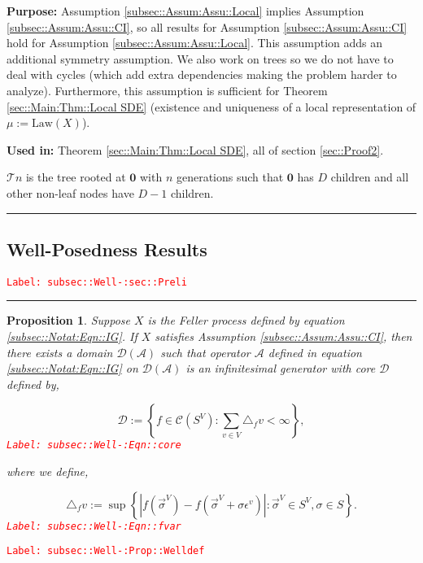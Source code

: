 \documentclass[12pt]{article}
\newcommand{\mc}{\mathcal}
\newcommand{\te}{\text}
\newcommand{\ep}{\epsilon}
\newcommand{\tr}{\textcolor{red}}
\newcommand{\labe}[1]{\tr{\texttt{Label: #1}}}
\newcommand{\purpose}{\textbf{Purpose: }}
\newcommand{\usein}{\textbf{Used in: }}
\newcommand{\ind}{\hspace{24pt}}
\newcommand{\lin}{\rule{\linewidth}{0.4 pt}}
\newcommand{\defeq}{:=}								%
\renewcommand{\root}{\mathbf{0}}				%
\renewcommand{\v}{v}							%
\renewcommand{\S}{S}							%
\newcommand{\s}{\sigma}							%
\newcommand{\sv}{\vec{\s}}						%
\newcommand{\ev}{\ep}							%
\newcommand{\X}{X}								%
\newcommand{\IG}{\mc{A}}						%
\newcommand{\f}{f}								%
\newcommand{\vind}[1]{^{#1}}					%
\newcommand{\carp}[1]{^{#1}}					%
\newcommand{\vsi}[1]{^{#1}}						%
\newcommand{\cind}[1]{_{#1}}					%
\newcommand{\degr}{D}							%
\newcommand{\tree}{\mc{T}}						%
\newcommand{\core}{\mc{D}}						%
\newcommand{\cont}{\mc{C}}						%
\newcommand{\delt}{\triangle}					%
\newcommand{\deltf}[1]{_{#1}}					%
\newcommand{\m}{\mu}							%
\newcommand{\law}{\te{Law}}						%
\newtheorem{prop}[thms]{Proposition}
\begin{document}
\purpose Assumption \ref{subsec::Assum:Assu::Local} implies Assumption \ref{subsec::Assum:Assu::CI}, so all results for Assumption \ref{subsec::Assum:Assu::CI} hold for Assumption \ref{subsec::Assum:Assu::Local}. This assumption adds an additional symmetry assumption. We also work on trees so we do not have to deal with cycles (which add extra dependencies making the problem harder to analyze). Furthermore, this assumption is sufficient for Theorem \ref{sec::Main:Thm::Local SDE} (existence and uniqueness of a local representation of \(\m{}{}{} \defeq \law(\X{}{})\)).

\usein Theorem \ref{sec::Main:Thm::Local SDE}, all of section \ref{sec::Proof2}.

\ind \(\tree{n}\) is the tree rooted at \(\root\) with \(n\) generations such that \(\root\) has \(\degr\) children and all other non-leaf nodes have \(\degr-1\) children.

\lin

\subsection{Well-Posedness Results}
\label{subsec::Well-:sec::Preli}\labe{subsec::Well-:sec::Preli}

\rule{\linewidth}{0.4 pt}

\begin{prop}
Suppose \(\X{}{}\) is the Feller process defined by equation \eqref{subsec::Notat:Eqn::IG}. If \(\X{}{}\) satisfies Assumption \ref{subsec::Assum:Assu::CI}, then there exists a domain \(\core(\IG)\) such that operator \(\IG\) defined in equation \eqref{subsec::Notat:Eqn::IG} on \(\mc{D}(\IG)\) is an infinitesimal generator with core \(\core\) defined by,

\begin{equation}
\core \defeq \left\{f \in \cont(\S\carp{V}): \sum_{\v\in V} \delt\deltf{\f}{\v} < \infty\right\},
\label{subsec::Well-:Eqn::core}
\end{equation}
\labe{subsec::Well-:Eqn::core}

where we define,

\begin{equation}
\delt\deltf{\f}{\v} \defeq \sup\left\{|f(\sv\cind{}\vsi{V}) - f(\sv\cind{}\vsi{V}+\s\ev\vind{\v})|: \sv\cind{}\vsi{V} \in \S\carp{V},\s \in \S\right\}.
\label{subsec::Well-:Eqn::fvar}
\end{equation}
\labe{subsec::Well-:Eqn::fvar}

\label{subsec::Well-:Prop::Welldef}
\end{prop}
\labe{subsec::Well-:Prop::Welldef}
\end{document}
